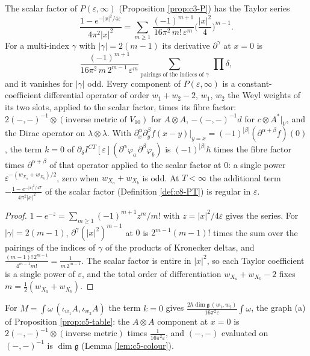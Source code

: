 \begin{lemma}
\label{lem:c10-self}
The scalar factor of $P(\varepsilon,\infty)$ (Proposition \ref{prop:c3-P}) has the Taylor series
\[
\frac{1-e^{-|x|^2/4\varepsilon}}{4\pi^2|x|^2}=\sum_{m\ge1}\frac{(-1)^{m+1}}{16\pi^2\,m!\,\varepsilon^m}\Big(\frac{|x|^2}4\Big)^{m-1}.
\]
For a multi-index $\gamma$ with $|\gamma|=2(m-1)$ its derivative $\partial^\gamma$ at $x=0$ is
\[
\frac{(-1)^{m+1}}{16\pi^2\,m\,2^{m-1}\,\varepsilon^m}\sum_{\text{pairings of the indices of }\gamma}\ \prod\delta ,
\]
and it vanishes for $|\gamma|$ odd. Every component of $P(\varepsilon,\infty)$ is a constant-coefficient differential operator of order $w_1+w_2-2$, $w_1$, $w_2$ the Weyl weights of its two slots, applied to the scalar factor, times its fibre factor: $2(-,-)^{-1}\otimes(\text{inverse metric of }V_{10})$ for $A\otimes A$, $-(-,-)^{-1}d$ for $c\otimes A^*|_V$, and the Dirac operator on $\lambda\otimes\lambda$. With $\partial^\alpha_x\partial^\beta_yf(x-y)|_{y=x}=(-1)^{|\beta|}(\partial^{\alpha+\beta}f)(0)$, the term $k=0$ of $\partial_\delta I^{CT}[\varepsilon](\partial^\alpha\varphi_a\,\partial^\beta\varphi_b)$ is $(-1)^{|\beta|}\hbar$ times the fibre factor times $\partial^{\alpha+\beta}$ of that operator applied to the scalar factor at $0$: a single power $\varepsilon^{-(w_{X_a}+w_{X_b})/2}$, zero when $w_{X_a}+w_{X_b}$ is odd. At $T<\infty$ the additional term $-\frac{1-e^{-|x|^2/4T}}{4\pi^2|x|^2}$ of the scalar factor (Definition \ref{def:c8-PT}) is regular in $\varepsilon$.
\end{lemma}

\begin{proof}
$1-e^{-z}=\sum_{m\ge1}(-1)^{m+1}z^m/m!$ with $z=|x|^2/4\varepsilon$ gives the series. For $|\gamma|=2(m-1)$, $\partial^\gamma(|x|^2)^{m-1}$ at $0$ is $2^{m-1}(m-1)!$ times the sum over the pairings of the indices of $\gamma$ of the products of Kronecker deltas, and $\frac{(m-1)!\,2^{m-1}}{4^{m-1}m!}=\frac1{m\,2^{m-1}}$. The scalar factor is entire in $|x|^2$, so each Taylor coefficient is a single power of $\varepsilon$, and the total order of differentiation $w_{X_a}+w_{X_b}-2$ fixes $m=\tfrac12(w_{X_a}+w_{X_b})$.
\end{proof}

\begin{example}
\label{ex:c10-vacuum}
For $M=\int\omega\,(\iota_{w_1}A,\iota_{w_2}A)$ the term $k=0$ gives $\frac{2\hbar\dim\mathfrak g\,(w_1,w_2)}{16\pi^2\varepsilon}\int\omega$, the graph (a) of Proposition \ref{prop:c5-table}: the $A\otimes A$ component at $x=0$ is $2(-,-)^{-1}\otimes(\text{inverse metric})$ times $\frac1{16\pi^2\varepsilon}$, and $(-,-)$ evaluated on $(-,-)^{-1}$ is $\dim\mathfrak g$ (Lemma \ref{lem:c5-colour}).
\end{example}


